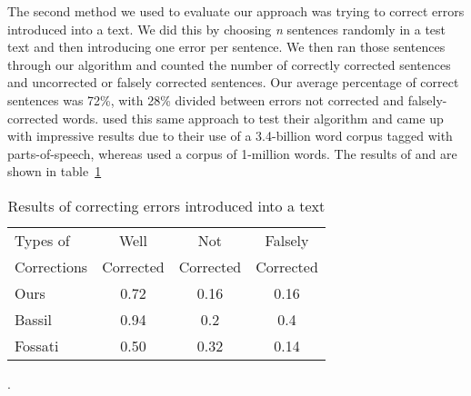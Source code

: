 \documentclass[twocolumn]{article}
\begin{document}
The second method we used to evaluate our approach was trying to correct errors
introduced into a text. We did this by choosing \textit{n} sentences randomly in a
test text and then introducing one error per sentence. We then ran those
sentences through our algorithm and counted the number of correctly corrected
sentences and uncorrected or falsely corrected sentences. Our average percentage
of correct sentences was 72\%, with 28\% divided between errors not corrected
and falsely-corrected words. \cite{Bassil12} used this same approach to test
their algorithm and came up with impressive results due to their use of a
3.4-billion word corpus tagged with parts-of-speech, whereas \cite{Fossati07}
used a corpus of 1-million words. The results of \cite{Bassil12} and
\cite{Fossati07} are shown in table~\ref{text}

\begin{table}[h]
    \centering
    \begin{tabular}{ | l | c | c | c | }
        \hline
        Types of & Well & Not & Falsely \\
        Corrections & Corrected & Corrected & Corrected \\
        \hline
        Ours & 0.72 & 0.16 & 0.16 \\
        \hline
        Bassil\cite{Bassil12} & 0.94 & 0.2 & 0.4 \\
        \hline
        Fossati\cite{Fossati07} & 0.50 & 0.32 & 0.14 \\
        \hline
    \end{tabular}
    \caption{Results of correcting errors introduced into a text}.
    \label{text}
\end{table}
\end{document}
